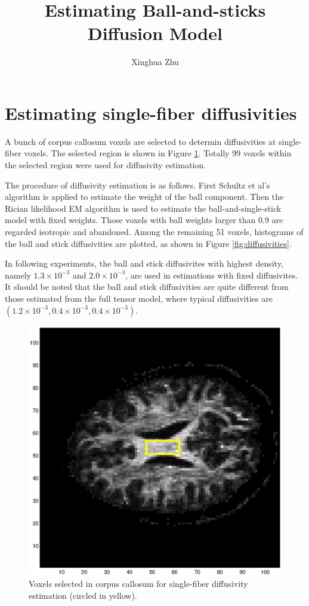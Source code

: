 \documentclass{article}
\begin{document}
\title{Estimating Ball-and-sticks Diffusion Model}
\author{Xinghua Zhu}

\maketitle

\section{Estimating single-fiber diffusivities}

A bunch of corpus callosum voxels are selected to determin diffusivities at single-fiber voxels.
The selected region is shown in Figure \ref{fig:cc}.
Totally 99 voxels within the selected region were used for diffusivity estimation.

The procedure of diffusivity estimation is as follows. First Schultz et al's algorithm \cite{Schultz2010} is applied to estimate the weight of the ball component. Then the Rician likelihood EM algorithm is used to estimate the ball-and-single-stick model with fixed weights. Those voxels with ball weights larger than 0.9 are regarded isotropic and abandoned. Among the remaining 51 voxels, histograms of the ball and stick diffusivities are plotted, as shown in Figure \ref{fig:diffusivities}.

In following experiments, the ball and stick diffusivites with highest density, namely $1.3\times 10^{-3}$ and $2.0\times 10^{-3}$, are used in estimations with fixed diffusivites. It should be noted that the ball and stick diffusivities are quite different from those estimated from the full tensor model, where typical diffusivities are $(1.2\times 10^{-3}, 0.4\times 10^{-3}, 0.4\times 10^{-3})$.

\begin{figure}[H]
  \centering
  \includegraphics[width=\textwidth]{figures/corpus_callosum.eps}
  \caption{Voxels selected in corpus callosum for single-fiber diffusivity estimation (circled in yellow).}
  \label{fig:cc}
\end{figure}
\end{document}

